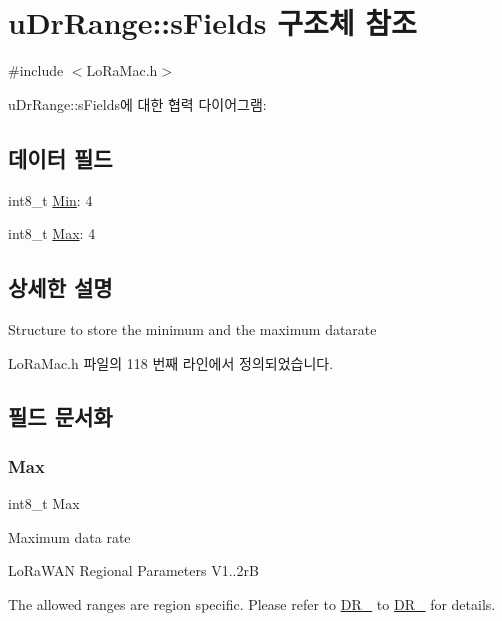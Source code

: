 \hypertarget{structu_dr_range_1_1s_fields}{}\section{u\+Dr\+Range\+:\+:s\+Fields 구조체 참조}
\label{structu_dr_range_1_1s_fields}


{\ttfamily \#include $<$Lo\+Ra\+Mac.\+h$>$}



u\+Dr\+Range\+:\+:s\+Fields에 대한 협력 다이어그램\+:
\subsection*{데이터 필드}
\begin{DoxyCompactItemize}
\item 
int8\+\_\+t \mbox{\hyperlink{structu_dr_range_1_1s_fields_ad870086364c5eb410eec40e1025e3203}{Min}}\+: 4
\item 
int8\+\_\+t \mbox{\hyperlink{structu_dr_range_1_1s_fields_a5d03c6d792ca60d11ffc7e7a2cb59dd0}{Max}}\+: 4
\end{DoxyCompactItemize}


\subsection{상세한 설명}
Structure to store the minimum and the maximum datarate 

Lo\+Ra\+Mac.\+h 파일의 118 번째 라인에서 정의되었습니다.



\subsection{필드 문서화}
\mbox{\label{structu_dr_range_1_1s_fields_a5d03c6d792ca60d11ffc7e7a2cb59dd0}} 
\subsubsection{\texorpdfstring{Max}{Max}}
{\footnotesize\ttfamily int8\+\_\+t Max}

Maximum data rate

Lo\+Ra\+W\+AN Regional Parameters V1..\+2rB

The allowed ranges are region specific. Please refer to \mbox{\hyperlink{group___r_e_g_i_o_n_ga6c4ef966b4f3d5eb7597b087f2b97095}{D\+R\+\_}} to \mbox{\hyperlink{group___r_e_g_i_o_n_gac6e078f51b71f05093daf27834997396}{D\+R\+\_}} for details. 

